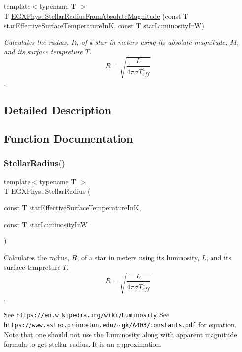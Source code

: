 \begin{DoxyCompactItemize}
{\footnotesize template$<$typename T $>$ }\\T \mbox{\hyperlink{group___e_g_x_phys-_stellar_radius_ga5c476c4ebcb0ad3e93a21393788d3dc2}{E\+G\+X\+Phys\+::\+Stellar\+Radius\+From\+Absolute\+Magnitude}} (const T star\+Effective\+Surface\+Temperature\+InK, const T star\+Luminosity\+InW)
\begin{DoxyCompactList}\small\item\em Calculates the radius, $R$, of a star in meters using its absolute magnitude, $M$, and its surface tempreture $T$. \[R=\sqrt{\dfrac{L}{4\pi \sigma T_{eff}^4}}\]. \end{DoxyCompactList}\end{DoxyCompactItemize}


\subsection{Detailed Description}


\subsection{Function Documentation}
\mbox{\label{group___e_g_x_phys-_stellar_radius_ga612cd22c37341a1864cd2fc5c858e18e}} 
\subsubsection{\texorpdfstring{Stellar\+Radius()}{StellarRadius()}}
{\footnotesize\ttfamily template$<$typename T $>$ \\
T E\+G\+X\+Phys\+::\+Stellar\+Radius (\begin{DoxyParamCaption}\item[{const T}]{star\+Effective\+Surface\+Temperature\+InK,  }\item[{const T}]{star\+Luminosity\+InW }\end{DoxyParamCaption})}



Calculates the radius, $R$, of a star in meters using its luminosity, $L$, and its surface tempreture $T$. \[R=\sqrt{\dfrac{L}{4\pi \sigma T_{eff}^4}}\]. 

See \href{https://en.wikipedia.org/wiki/Luminosity}{\tt https\+://en.\+wikipedia.\+org/wiki/\+Luminosity} See \href{https://www.astro.princeton.edu/~gk/A403/constants.pdf}{\tt https\+://www.\+astro.\+princeton.\+edu/$\sim$gk/\+A403/constants.\+pdf} for equation. Note that one should not use the Luminosity along with apparent magnitude formula to get stellar radius. It is an approximation.


